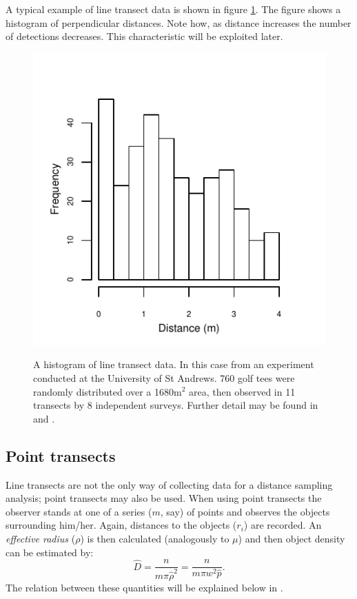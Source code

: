 A typical example of line transect data is shown in figure \ref{ds-lt-example}. The figure shows a histogram of perpendicular distances. Note how, as distance increases the number of detections decreases. This characteristic will be exploited later.

\begin{figure}
\centering
\includegraphics{intro/figs/ds-golftee.pdf}\\
\caption{A histogram of line transect data. In this case from an experiment conducted at the University of St Andrews. 760 golf tees were randomly distributed over a 1680m$^2$ area, then observed in 11 transects by 8 independent surveys. Further detail may be found in  and .}
\label{ds-lt-example}
\end{figure}

\subsection{Point transects}
Line transects are not the only way of collecting data for a distance sampling analysis; point transects may also be used. When using point transects the observer stands at one of a series ($m$, say) of points and observes the objects surrounding him/her. Again, distances to the objects ($r_i$) are recorded. An \textit{effective radius} ($\rho$) is then calculated (analogously to $\mu$) and then object density can be estimated by\label{cor-7s1}:
\begin{equation*}
\hat{D}=\frac{n}{m \pi \hat{\rho}^2}=\frac{n}{m\pi w^2\hat{p}}.
\end{equation*}
The relation between these quantities will be explained below in .


